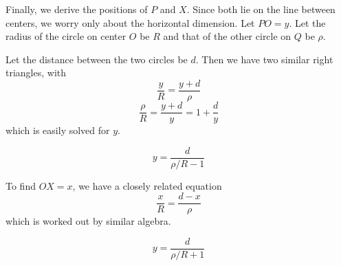 \documentclass[11pt, oneside]{article}
\begin{document}
Finally, we derive the positions of $P$ and $X$.  Since both lie on the line between centers, we worry only about the horizontal dimension.  Let $PO = y$.  Let the radius of the circle on center $O$ be $R$ and that of the other circle on $Q$ be $\rho$.

Let the distance between the two circles be $d$.  Then we have two similar right triangles, with
\[ \frac{y}{R} = \frac{y+d}{\rho} \]
\[ \frac{\rho}{R} = \frac{y+d}{y} = 1 + \frac{d}{y} \]
which is easily solved for $y$.

\[ y = \frac{d}{\rho/R - 1} \]

To find $OX = x$, we have a closely related equation 
\[ \frac{x}{R} = \frac{d-x}{\rho} \]
which is worked out by similar algebra.

\[ y = \frac{d}{\rho/R + 1} \]
\end{document}
